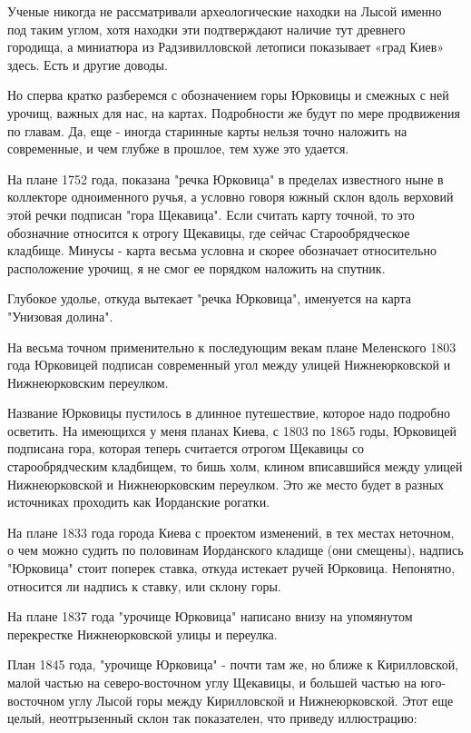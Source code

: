 Ученые никогда не рассматривали археологические находки на Лысой именно под таким углом, хотя находки эти подтверждают наличие тут древнего городища, а миниатюра из Радзивилловской летописи показывает «град Киев» здесь. Есть и другие доводы.

Но сперва кратко разберемся с обозначением горы Юрковицы и смежных с ней урочищ, важных для нас, на картах. Подробности же будут по мере продвижения по главам. Да, еще - иногда старинные карты нельзя точно наложить на современные, и чем глубже в прошлое, тем хуже это удается.

На плане 1752 года, показана "речка Юрковица" в пределах известного ныне в коллекторе одноименного ручья, а условно говоря южный склон вдоль верховий этой речки подписан "гора Щекавица". Если считать карту точной, то это обозначние относится к отрогу Щекавицы, где сейчас Старообрядческое кладбище. Минусы - карта весьма условна и скорее обозначает относительно расположение урочищ, я не смог ее порядком наложить на спутник.

Глубокое удолье, откуда вытекает "речка Юрковица", именуется на карта "Унизовая долина".

На весьма точном применительно к последующим векам плане Меленского 1803 года Юрковицей подписан современный угол между улицей Нижнеюрковской и Нижнеюрковским переулком.

Название Юрковицы пустилось в длинное путешествие, которое надо подробно осветить. На имеющихся у меня планах Киева, с 1803 по 1865 годы, Юрковицей подписана гора, которая теперь считается отрогом Щекавицы со старообрядческим кладбищем, то бишь холм, клином вписавшийся между улицей Нижнеюрковской и Нижнеюрковским переулком. Это же место будет в разных источниках проходить как Иорданские рогатки.

На плане 1833 года города Киева с проектом изменений, в тех местах неточном, о чем можно судить по половинам Иорданского кладище (они смещены), надпись "Юрковица" стоит поперек ставка, откуда истекает ручей Юрковица. Непонятно, относится ли надпись к ставку, или склону горы.

На плане 1837 года "урочище Юрковица" написано внизу на упомянутом перекрестке Нижнеюрковской улицы и переулка.

План 1845 года, "урочище Юрковица" - почти там же, но ближе к Кирилловской, малой частью на северо-восточном углу Щекавицы, и большей частью на юго-восточном углу Лысой горы между Кирилловской и Нижнеюрковской. Этот еще целый, неотгрызенный склон так показателен, что приведу иллюстрацию:

